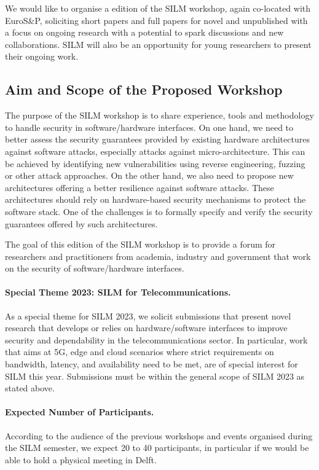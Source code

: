 \documentclass[a4paper,11pt]{article}
\newcommand{\SILMNum}{\nth{5}}
\newcommand{\SILMYear}{2023}
\begin{document}
We would like to organise a \SILMNum{} edition of the SILM workshop, again
co-located with EuroS\&P, soliciting short papers and full papers for novel
and unpublished with a focus on ongoing research with a potential to spark
discussions and new collaborations. SILM will also be an opportunity for
young researchers to present their ongoing work.

\subsection{Aim and Scope of the Proposed Workshop}
%
The purpose of the SILM workshop is to share experience, tools and
methodology to handle security in software/hardware interfaces. On one
hand, we need to better assess the security guarantees provided by existing
hardware architectures against software attacks, especially attacks against
micro-architecture. This can be achieved by identifying new vulnerabilities
using reverse engineering, fuzzing or other attack approaches. On the other
hand, we also need to propose new architectures offering a better
resilience against software attacks. These architectures should rely on
hardware-based security mechanisms to protect the software stack. One of
the challenges is to formally specify and verify the security guarantees
offered by such architectures.

The goal of this \SILMNum{} edition of the SILM workshop is to provide a forum
for  researchers and practitioners from academia, industry and government
that work on the security of software/hardware interfaces.

\paragraph{Special Theme \SILMYear{}: SILM for Telecommunications.}
%
As a special theme for SILM \SILMYear{}, we solicit submissions that
present novel research that develops or relies on hardware/software
interfaces to improve security and dependability in the telecommunications
sector. In particular, work that aims at 5G, edge and cloud scenarios where
strict requirements on bandwidth, latency, and availability need to be met,
are of special interest for SILM this year. Submissions must be within the
general scope of SILM \SILMYear{} as stated above.

\paragraph{Expected Number of Participants.}
%
According to the audience of the previous workshops and events organised
during the SILM semester, we expect 20 to 40 participants, in particular if
we would be able to hold a physical meeting in Delft.
\end{document}
